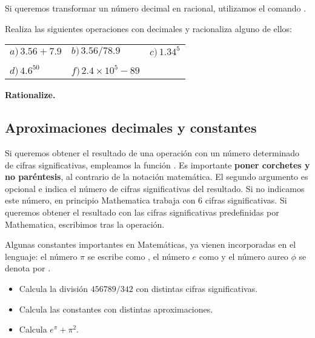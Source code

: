 \documentclass[a4paper,10pt, draft]{article}
\newcommand{\com}[1]{\textbf{\color{blue}{#1}}}
\newenvironment{ejer}{\begin{tcolorbox}[center title, title=Ejercicios,
fonttitle=\sffamily\bfseries,colback=blue!5,colframe=orange]}{\end{tcolorbox}}
\newenvironment{funciones}{\begin{tcolorbox}[center title, title=Nuevas funciones, fonttitle=\sffamily\bfseries, colback=green!5!white,colframe=red!75!black]}{\end{tcolorbox}\bigskip}
\begin{document}
Si queremos transformar un número decimal en racional, utilizamos el comando \com{Rationalize[x]}.


\begin{ejer}
Realiza las siguientes operaciones con  decimales y racionaliza alguno de ellos:


\begin{center}
\begin{tabular}{lll}


  $a)\,3.56 + 7.9 $ & $b)\,3.56/ 78.9$ &  $c)\,1.34^5 $\\
  & & \\
$ d)\, 4.6^{50} $ & $ f)\,2.4 \times 10^5 -89$ & 

\end{tabular}
\end{center}
\end{ejer}

\begin{funciones}

\textbf{Rationalize.}

\end{funciones}

\newpage


\subsection{Aproximaciones decimales y constantes}

Si queremos obtener el resultado de una operación con un número determinado de cifras significativas, empleamos la función \com{N[x,n]}. Es importante \textbf{poner corchetes y no paréntesis}, al contrario de la notación matemática. El segundo argumento es opcional e indica el número de cifras significativas del resultado. Si no indicamos este número, en principio Mathematica trabaja con 6 cifras significativas. Si queremos obtener el resultado con las cifras significativas predefinidas por Mathematica, escribimos \com{//N} tras la operación.

Algunas constantes importantes en Matemáticas, ya vienen incorporadas en el lenguaje:
el número $\pi$ se escribe como \com{Pi}, el número $e$ como \com{E} y el número aureo $\phi$ se denota por \com{GoldenRatio}.


\begin{ejer}


\begin{itemize}


 \item Calcula la división $456789/342$ con distintas cifras significativas.


 \item Calcula las constantes con distintas aproximaciones.
 
\item Calcula $e^\pi +\pi^2$.

\end{itemize}

\end{ejer}
\end{document}

